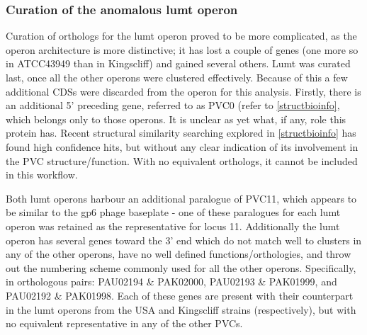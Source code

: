 \subsubsection{Curation of the anomalous lumt operon}\label{anomalouslumt}
Curation of orthologs for the lumt operon proved to be more complicated, as the operon architecture is more distinctive; it has lost a couple of genes (one more so in ATCC43949 than in Kingscliff) and gained several others. Lumt was curated last, once all the other operons were clustered effectively. Because of this a few additional CDSs were discarded from the operon for this analysis. Firstly, there is an additional 5' preceding gene, referred to as PVC0 (refer to \vref{structbioinfo}, which belongs only to those operons. It is unclear as yet what, if any, role this protein has. Recent structural similarity searching explored in \vref{structbioinfo} has found high confidence hits, but without any clear indication of its involvement in the PVC structure/function. With no equivalent orthologs, it cannot be included in this workflow.

Both lumt operons harbour an additional paralogue of PVC11, which appears to be similar to the gp6 phage baseplate - one of these paralogues for each lumt operon was retained as the representative for locus 11. Additionally the lumt operon has several genes toward the 3' end which do not match well to clusters in any of the other operons, have no well defined functions/orthologies, and throw out the numbering scheme commonly used for all the other operons. Specifically, in orthologous pairs: PAU02194 \& PAK02000, PAU02193 \& PAK01999, and PAU02192 \& PAK01998. Each of these genes are present with their counterpart in the lumt operons from the USA and Kingscliff strains (respectively), but with no equivalent representative in any of the other PVCs.



